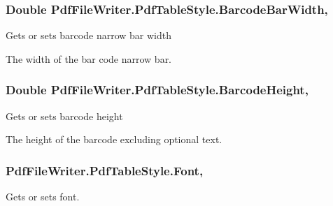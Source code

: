\subsubsection[{\texorpdfstring{Barcode\+Bar\+Width}{BarcodeBarWidth}}]{\setlength{\rightskip}{0pt plus 5cm}Double Pdf\+File\+Writer.\+Pdf\+Table\+Style.\+Barcode\+Bar\+Width\hspace{0.3cm}{\ttfamily [get]}, {\ttfamily [set]}}\hypertarget{class_pdf_file_writer_1_1_pdf_table_style_af764f91e2e5449d206303df707608b00}{}\label{class_pdf_file_writer_1_1_pdf_table_style_af764f91e2e5449d206303df707608b00}


Gets or sets barcode narrow bar width 

The width of the bar code narrow bar. 
\subsubsection[{\texorpdfstring{Barcode\+Height}{BarcodeHeight}}]{\setlength{\rightskip}{0pt plus 5cm}Double Pdf\+File\+Writer.\+Pdf\+Table\+Style.\+Barcode\+Height\hspace{0.3cm}{\ttfamily [get]}, {\ttfamily [set]}}\hypertarget{class_pdf_file_writer_1_1_pdf_table_style_ad41e21ccbd1a440079833c972d694046}{}\label{class_pdf_file_writer_1_1_pdf_table_style_ad41e21ccbd1a440079833c972d694046}


Gets or sets barcode height 

The height of the barcode excluding optional text. 
\subsubsection[{\texorpdfstring{Font}{Font}}]{ Pdf\+File\+Writer.\+Pdf\+Table\+Style.\+Font\hspace{0.3cm}{\ttfamily [get]}, {\ttfamily [set]}}\hypertarget{class_pdf_file_writer_1_1_pdf_table_style_a862b654b3ee257db021e515cc358739a}{}\label{class_pdf_file_writer_1_1_pdf_table_style_a862b654b3ee257db021e515cc358739a}


Gets or sets font. 

